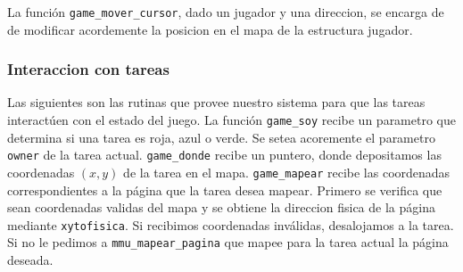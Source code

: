 La función \verb|game_mover_cursor|, dado un jugador y una direccion, se encarga de de modificar acordemente la posicion en el mapa de la estructura jugador.

\subsubsection{Interaccion con tareas}

Las siguientes son las rutinas que provee nuestro sistema para que las tareas interactúen con el estado del juego.
La función \verb|game_soy| recibe un parametro que determina si una tarea es roja, azul o verde. Se setea acoremente el parametro \verb|owner| de la tarea actual.
\verb|game_donde| recibe un puntero, donde depositamos las coordenadas $(x,y)$ de la tarea en el mapa.
\verb|game_mapear| recibe las coordenadas correspondientes a la página que la tarea desea mapear. Primero se verifica que sean coordenadas validas del mapa y se obtiene la direccion fisica de la página mediante \verb|xytofisica|. Si recibimos coordenadas inválidas, desalojamos a la tarea. Si no le pedimos a \verb|mmu_mapear_pagina| que mapee para la tarea actual la página deseada. \\


